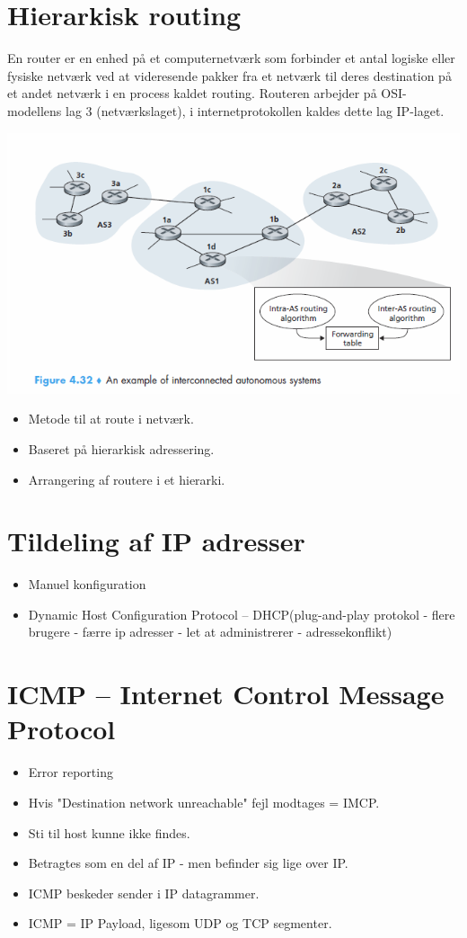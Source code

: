 {{{{{\section{Hierarkisk routing}
En router er en enhed på et computernetværk som forbinder et antal logiske eller fysiske netværk ved at videresende pakker fra et netværk til deres destination på et andet netværk i en process kaldet routing. Routeren arbejder på OSI-modellens lag 3 (netværkslaget), i internetprotokollen kaldes dette lag IP-laget.
\begin{center}
  \includegraphics[scale=0.8]{4-network-layer/hierarkisk-routing.png}
\end{center}
\begin{itemize}
	\item Metode til at route i netværk.
	\item Baseret på hierarkisk adressering.
	\item Arrangering af routere i et hierarki. 
\end{itemize}


\section{Tildeling af IP adresser}
\begin{itemize}
	\item Manuel konfiguration
	\item Dynamic Host Configuration Protocol – DHCP(plug-and-play protokol - flere brugere - færre ip adresser - let at administrerer - adressekonflikt)
\end{itemize}


\section{ICMP – Internet Control Message Protocol}
\begin{itemize}
	\item Error reporting
	\item Hvis "Destination network unreachable" fejl modtages = IMCP.
	\item Sti til host kunne ikke findes.
	\item Betragtes som en del af IP - men befinder sig lige over IP.
	\item ICMP beskeder sender i IP datagrammer.
	\item ICMP = IP Payload, ligesom UDP og TCP segmenter.


\end{itemize}}}}}}
